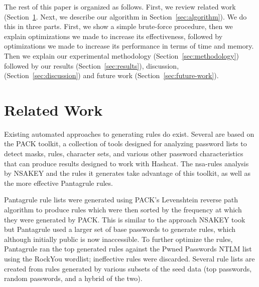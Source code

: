 \documentclass[letterpaper,twocolumn,10pt]{article}
\begin{document}
The rest of this paper is organized as follows. First, we review related work
(Section~\ref{sec:related-work}. Next, we describe our algorithm in
Section~\ref{sec:algorithm}). We do this in three parts. First, we show a
simple brute-force procedure, then we explain optimizations we made to increase
its effectiveness, followed by optimizations we made to increase its
performance in terms of time and memory. Then we explain our experimental
methodology (Section~\ref{sec:methodology}) followed by our results
(Section~\ref{sec:results}), discussion, (Section~\ref{sec:discussion}) and
future work (Section~\ref{sec:future-work}).




\section{Related Work}
\label{sec:related-work}

Existing automated approaches to generating rules do exist. Several are based
on the PACK toolkit,\cite{PACK} a collection of tools designed for analyzing
password lists to detect masks, rules, character sets, and various other
password characteristics that can produce results designed to work with
Hashcat. The nsa-rules analysis by NSAKEY\cite{NSAKEY} and the rules it
generates take advantage of this toolkit, as well as the more effective
Pantagrule rules.\cite{pantagrule}

Pantagrule rule lists were generated using PACK's Levenshtein reverse path
algorithm to produce rules which were then sorted by the frequency at which
they were generated by PACK. This is similar to the approach NSAKEY took but
Pantagrule used a larger set of base passwords to generate rules, which
although initially public is now inaccessible. To further optimize the rules,
Pantagrule ran the top generated rules against the Pwned Passwords NTLM list
using the RockYou wordlist; ineffective rules were discarded. Several rule lists
are created from rules generated by various subsets of the seed data (top
passwords, random passwords, and a hybrid of the two).
\end{document}
